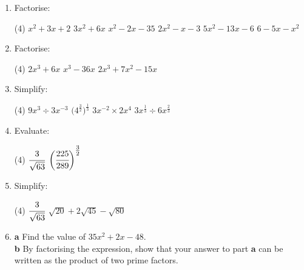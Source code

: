 \documentclass[fleqn, twoside]{article}
\begin{document}
\begin{enumerate}
    \item Factorise:
        \begin{tasks}(4) %
            \task $x^2+3x+2$            %
            \task $3x^2+6x$             %
            \task $x^2-2x-35$           %
            \task $2x^2-x-3$            %
            \task $5x^2-13x-6$          %
            \task $6-5x-x^2$            %
        \end{tasks}
        
    \item Factorise:
        \begin{tasks}(4)%
            \task $2x^3+6x$            %
            \task $x^3-36x$            %
            \task $2x^3+7x^2-15x$      %
        \end{tasks}
        
    \item Simplify: \vspace{-2mm}
        \begin{tasks}(4) %
            \task $9x^3 \div 3x^{-3}$
            \task $\big(4^{\textstyle\frac{3}{2}}\big)^{\textstyle\frac{1}{3}}$
            \task $3x^{-2} \times 2x^4$
            \task $3x^{\textstyle\frac{1}{3}} \div 6x^{\textstyle\frac{2}{3}}$
        \end{tasks}
        
    \item Evaluate: \vspace{-2mm}
        \begin{tasks}(4) %
            \task $\cfrac{3}{\sqrt{63}}$
            \task $\bigg(\cfrac{225}{289}\bigg)^{\textstyle\frac{3}{2}}$
        \end{tasks}
        
    \item Simplify: \vspace{-2mm} %
        \begin{tasks}(4)
            \task $\cfrac{3}{\sqrt{63}}$                %
            \task $\sqrt{20}+2\sqrt{45}-\sqrt{80}$      %
        \end{tasks}
        
    \item \hspace*{2mm}\textbf{a}\hspace*{5mm} Find the value of $35x^2+2x-48$.\vspace{1mm}\\
          \hspace*{2mm}\textbf{b}\hspace*{5mm} By factorising the expression, show that your answer to part \textbf{a} can be written as the product of two \linebreak\hspace*{10.5mm}prime factors.
          

\end{enumerate}
\end{document}
